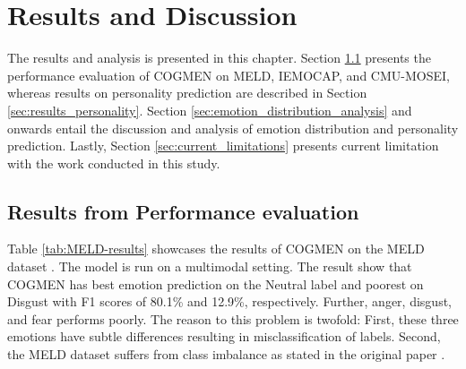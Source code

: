 \chapter{Results and Discussion}
\label{chap:results}
The results and analysis is presented in this chapter. Section \ref{sec:performance_evaluation} presents the performance evaluation of COGMEN on MELD, IEMOCAP, and CMU-MOSEI, whereas results on personality prediction are described in Section \ref{sec:results_personality}. Section \ref{sec:emotion_distribution_analysis} and onwards entail the discussion and analysis of emotion distribution and personality prediction. Lastly, Section \ref{sec:current_limitations} presents current limitation with the work conducted in this study. 

\section{Results from Performance evaluation}
\label{sec:performance_evaluation}
Table \ref{tab:MELD-results} showcases the results of COGMEN on the MELD dataset \cite{HP_Advanced}. The model is run on a multimodal setting. The result show that COGMEN has best emotion prediction on the Neutral label and poorest on Disgust with F1 scores of 80.1\% and 12.9\%, respectively. Further, anger, disgust, and fear performs poorly. The reason to this problem is twofold: First, these three emotions have subtle differences resulting in misclassification of labels. Second, the MELD dataset suffers from class imbalance as stated in the original paper \cite{meld_dataset}.   
%
\begin{table}[h]
    \caption{Results on the MELD dataset for 7-emotion class. Avg. denotes the weighted average.}
    \centering
    \label{tab:MELD-results}
\end{table}
%


